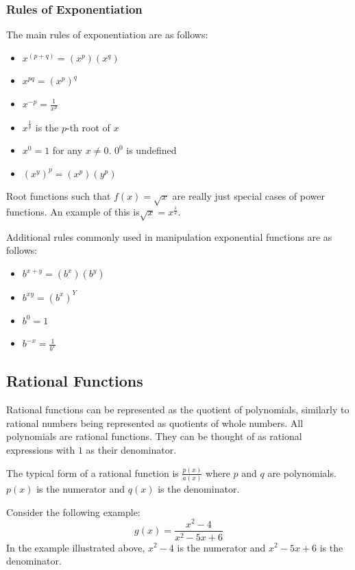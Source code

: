 \documentclass[11pt,oneside]{book}              %
\begin{document}
\subsubsection{Rules of Exponentiation}
The main rules of exponentiation are as follows:
\begin{itemize}
	\item $x^{(p + q)} = (x^p)(x^q)$
	\item $x^{pq} = (x^p)^q$
	\item $x^{-p} = \frac{1}{x^p}$
	\item $x^{\frac{1}{p}}$ is the $p$-th root of $x$
	\item $x^0 = 1$ for any $x\neq 0$. $0^0$ is undefined
	\item $(x^y)^p = (x^p)(y^p)$
\end{itemize}

Root functions such that $f(x) = \sqrt{x}$ are really just special cases of power functions. An example of this is$\sqrt{x} = x^{\frac{1}{2}}$.

Additional rules commonly used in manipulation exponential functions are as follows:
\begin{itemize}
	\item $b^{x + y} = (b^x)(b^y)$
	\item $b^{xy} = (b^x)^Y$
	\item $b^0 = 1$
	\item $b^{-x} = \frac{1}{b^x}$
\end{itemize}

\subsection{Rational Functions}
Rational functions can be represented as the quotient of polynomials, similarly to  rational numbers being represented as quotients of whole numbers. All polynomials are rational functions. They can be thought of as rational expressions with $1$ as their denominator.

The typical form of a rational function is $\frac{p(x)}{a(x)}$ where $p$ and $q$ are polynomials. $p(x)$ is the numerator and $q(x)$ is the denominator.

Consider the following example:
\begin{equation*}
  g(x) = \frac{x^2 - 4}{x^2 - 5x + 6}
\end{equation*}
In the example illustrated above,  $x^2 - 4$ is the numerator and $x^2 - 5x + 6$ is the denominator.
\end{document}
